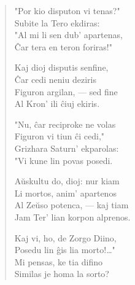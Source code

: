 \begin{verse}
                        "Por kio disputon vi tenas?"\\
                        Subite la Tero ekdiras:\\
                        "Al mi li sen dub' apartenas,\\
                        \^Car tera en teron foriras!"

                        Kaj dioj disputis senfine,\\
                        \^Car cedi neniu deziris\\
                        Figuron argilan, --- sed fine\\
                        Al Kron' ili \^ciuj ekiris.

                        "Nu, \^car reciproke ne volas\\
                        Figuron vi tiun \^ci cedi,"\\
                        Grizhara Saturn' ekparolas:\\
                        "Vi kune lin povas posedi.

                        A\u uskultu do, dioj: nur kiam\\
                        Li mortos, anim' apartenos\\
                        Al Ze\u uso potenca, --- kaj tiam\\
                        Jam Ter' lian korpon alprenos.

                        Kaj vi, ho, de Zorgo Diino,\\
                        Posedu lin \^gis lia morto!\dots"\\
                        Mi pensas, ke tia difino\\
                        Similas je homa la sorto?

\end{verse}


\smallrule{}


